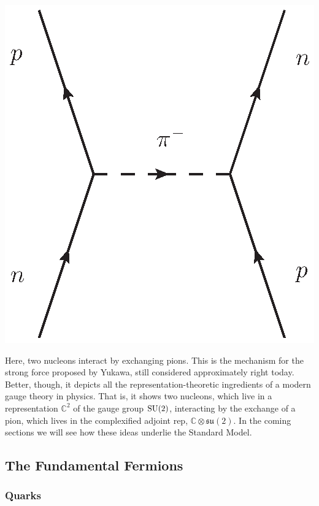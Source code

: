 \documentclass{article}
\newcommand{\C}{{\mathbb C}}  %
\newcommand{\SU}{{\rm SU}}    %
\newcommand{\su}{{\mathfrak{su}}}  %
\begin{document}
\begin{center}
	\includegraphics[scale=0.75]{piN_exchange}
\end{center}

Here, two nucleons interact by exchanging pions. This is the mechanism
for the strong force proposed by Yukawa, still considered
approximately right today.  Better, though, it depicts all the
representation-theoretic ingredients of a modern gauge theory in
physics. That is, it shows two nucleons, which live in a
representation $\C^2$ of the gauge group $\SU(2)$, interacting by the
exchange of a pion, which lives in the complexified adjoint rep,
$\C \otimes \su(2)$. In the coming sections we will see how these
ideas underlie the Standard Model.

\subsection{The Fundamental Fermions} \label{sec:fermions}

\subsubsection{Quarks} \label{sec:quarks}
\end{document}

